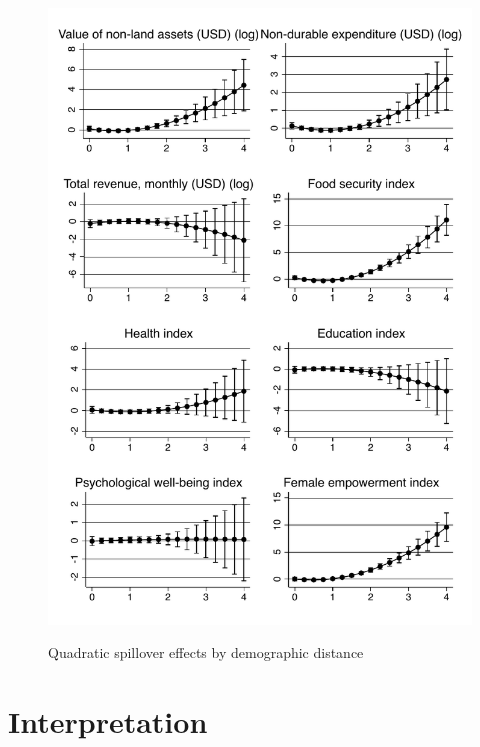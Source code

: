 \documentclass[11pt]{article}
\begin{document}
    \begin{figure}[ht]
    \centering
    \caption{Quadratic spillover effects by demographic distance}
    \includegraphics[height=0.85\textheight]{../Figs/indices_log_margins.pdf}
    \label{fig:margins}
    \end{figure}

\section{Interpretation}
\end{document}
